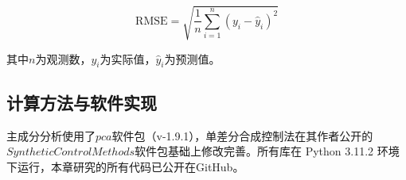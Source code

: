 \begin{equation}
    \label{ch5:eq:RMSE}
    \text{RMSE} = \sqrt{\frac{1}{n}\sum_{i=1}^{n}{(y_i-\hat{y}_i)}^2} 
\end{equation}

其中$n$为观测数，$y_i$为实际值，$\hat{y}_i$为预测值。

\subsection{计算方法与软件实现}

主成分分析使用了$pca$软件包（v-1.9.1）\cite{Taskesen_pca_A_Python_2020}，单差分合成控制法在其作者公开的$Synthetic Control Methods$软件包基础上修改完善\cite{arkhangelsky2021}。所有库在 Python 3.11.2 环境下运行，本章研究的所有代码已公开在GitHub\cite{song2022c}。
